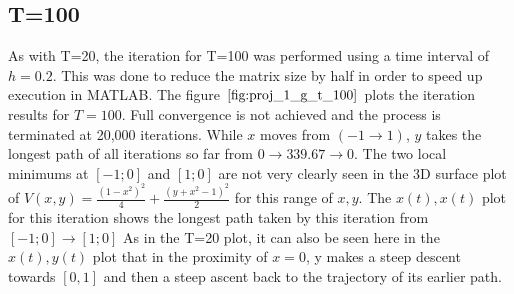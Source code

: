 \documentclass[twoside,12pt]{article}
\begin{document}
\subsection{T=100}
{
As with T=20, the iteration for T=100 was performed using a time interval of $h=0.2$. This was done to reduce the matrix size by half in order to speed up execution in MATLAB. The figure $\eqref{fig:proj_1_g_t_100}$ plots the iteration results for $T=100$. Full convergence is not achieved and the process is terminated at 20,000 iterations. While $x$ moves from $(-1 \to 1)$, $y$ takes the longest path of all iterations so far from $0 \to 339.67 \to 0$. The two local minimums at $[-1;0]$ and $[1;0]$ are not very clearly seen in the 3D surface plot of $V(x,y) =  \frac{(1-x^2)^2}{4} + \frac{(y+x^2-1)^2}{2}$ for this range of $x,y$. The $x(t),x(t)$ plot for this iteration shows the longest path taken by this iteration from $[-1;0] \to [1;0]$ As in the T=20 plot, it can also be seen here in the $x(t),y(t)$ plot that in the proximity of $x=0$, y makes a steep descent towards $[0,1]$ and then a steep ascent back to the trajectory of its earlier path.
\begin{figure}[htbp!]
     \begin{center}
            \hspace*{-1.4in}           
                    \\%
                    \subfigure[]{%
                    	\hspace*{-1.6in}      
}
\end{center}
\end{figure}}
\end{document}
